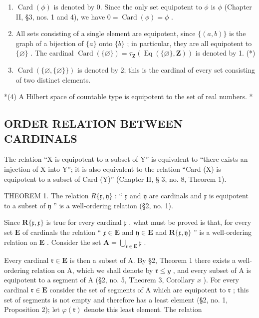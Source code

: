 \begin{enumerate}
\def\labelenumi{(\arabic{enumi})}
\item
  \(\operatorname{Card}(\phi)\) is denoted by 0. Since the only set equipotent to \(\phi\) is \(\phi\) (Chapter II, §3, nos. 1 and 4), we have \(0 = \operatorname{Card}(\phi) = \phi\) .
\item
  All sets consisting of a single element are equipotent, since \(\{(a, b)\}\) is the graph of a bijection of \(\{a\}\) onto \(\{b\}\) ; in particular, they are all equipotent to \(\{\varnothing\}\) . The cardinal \(\operatorname{Card}(\{\varnothing\}) = \tau_{\mathbf{Z}}(\operatorname{Eq}(\{\varnothing\}, \mathbf{Z}))\) is denoted by 1. (*)
\item
  \(\operatorname{Card}(\{\varnothing, \{\varnothing\}\})\) is denoted by 2; this is the cardinal of every set consisting of two distinct elements.
\end{enumerate}

*(4) A Hilbert space of countable type is equipotent to the set of real numbers. *

\subsection{ORDER RELATION BETWEEN CARDINALS}

The relation ``X is equipotent to a subset of Y'' is equivalent to ``there exists an injection of X into Y''; it is also equivalent to the relation ``Card (X) is equipotent to a subset of Card (Y)'' (Chapter II, § 3, no. 8, Theorem 1).

THEOREM 1. The relation \(R\{\mathfrak{x}, \mathfrak{y}\}\) : `` \(\mathfrak{x}\) and \(\mathfrak{y}\) are cardinals and \(\mathfrak{x}\) is equipotent to a subset of \(\mathfrak{y}\) '' is a well-ordering relation (§2, no. 1).

Since \(\mathbf{R}\{\mathfrak{x},\mathfrak{x}\}\) is true for every cardinal \(\mathfrak{x}\) , what must be proved is that, for every set \(\mathbf{E}\) of cardinals the relation `` \(\mathfrak{x} \in \mathbf{E}\) and \(\mathfrak{y} \in \mathbf{E}\) and \(\mathbf{R}\{\mathfrak{x},\mathfrak{y}\}\) '' is a well-ordering relation on \(\mathbf{E}\) . Consider the set \(\mathbf{A} = \bigcup_{\mathfrak{r}\in \mathbf{E}}\mathfrak{x}\) .

Every cardinal \(\mathfrak{r} \in \mathbf{E}\) is then a subset of A. By §2, Theorem 1 there exists a well-ordering relation on A, which we shall denote by \(\mathfrak{r} \leqslant y\) , and every subset of A is equipotent to a segment of A (§2, no. 5, Theorem 3, Corollary \(x\) ). For every cardinal \(\mathfrak{r} \in \mathbf{E}\) consider the set of segments of A which are equipotent to \(\mathfrak{r}\) ; this set of segments is not empty and therefore has a least element (§2, no. 1, Proposition 2); let \(\varphi(\mathfrak{r})\) denote this least element. The relation

